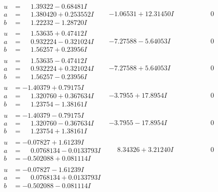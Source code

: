\documentclass[1p]{elsarticle_modified}
\theoremstyle{definition}
\begin{document}
$$\begin{array}{c|c|c}
\begin{aligned}
u &= \phantom{-}1.39322 - 0.68481 I \\
a &= \phantom{-}1.380420 + 0.253552 I \\
b &= \phantom{-}1.22232 - 1.28720 I\end{aligned}
 & -1.06531 + 12.31450 I & \phantom{-0.000000 } 0 \\ \hline\begin{aligned}
u &= \phantom{-}1.53635 + 0.47412 I \\
a &= \phantom{-}0.932224 - 0.321024 I \\
b &= \phantom{-}1.56257 + 0.23956 I\end{aligned}
 & -7.27588 - 5.64053 I & \phantom{-0.000000 } 0 \\ \hline\begin{aligned}
u &= \phantom{-}1.53635 - 0.47412 I \\
a &= \phantom{-}0.932224 + 0.321024 I \\
b &= \phantom{-}1.56257 - 0.23956 I\end{aligned}
 & -7.27588 + 5.64053 I & \phantom{-0.000000 } 0 \\ \hline\begin{aligned}
u &= -1.40379 + 0.79175 I \\
a &= \phantom{-}1.320760 + 0.367634 I \\
b &= \phantom{-}1.23754 - 1.38161 I\end{aligned}
 & -3.7955 + 17.8954 I & \phantom{-0.000000 } 0 \\ \hline\begin{aligned}
u &= -1.40379 - 0.79175 I \\
a &= \phantom{-}1.320760 - 0.367634 I \\
b &= \phantom{-}1.23754 + 1.38161 I\end{aligned}
 & -3.7955 - 17.8954 I & \phantom{-0.000000 } 0 \\ \hline\begin{aligned}
u &= -0.07827 + 1.61239 I \\
a &= \phantom{-}0.0768134 - 0.0133793 I \\
b &= -0.502088 + 0.081114 I\end{aligned}
 & \phantom{-}8.34326 + 3.21240 I & \phantom{-0.000000 } 0 \\ \hline\begin{aligned}
u &= -0.07827 - 1.61239 I \\
a &= \phantom{-}0.0768134 + 0.0133793 I \\
b &= -0.502088 - 0.081114 I\end{aligned}

\end{array}$$
\end{document}
